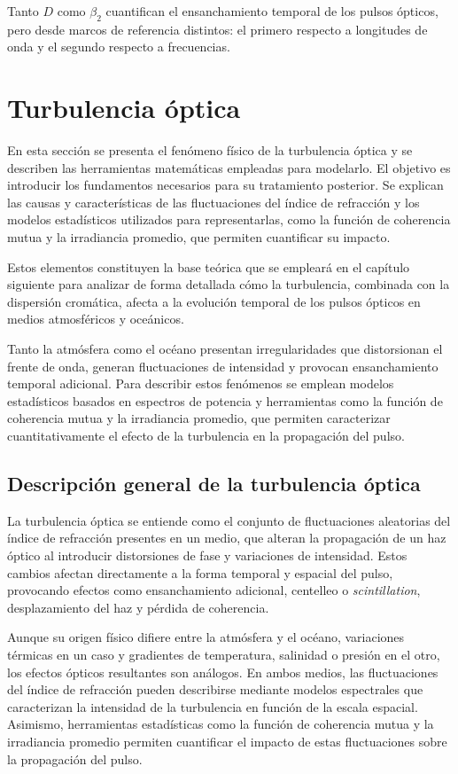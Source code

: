 Tanto $D$ como $\beta_{2}$ cuantifican el ensanchamiento temporal de los pulsos ópticos, pero desde marcos de referencia distintos: el primero respecto a longitudes de onda y el segundo respecto a frecuencias.

\section{Turbulencia óptica}

En esta sección se presenta el fenómeno físico de la turbulencia óptica y se describen las herramientas matemáticas empleadas para modelarlo. El objetivo es introducir los fundamentos necesarios para su tratamiento posterior. Se explican las causas y características de las fluctuaciones del índice de refracción y los modelos estadísticos utilizados para representarlas, como la función de coherencia mutua y la irradiancia promedio, que permiten cuantificar su impacto. 

Estos elementos constituyen la base teórica que se empleará en el capítulo siguiente para analizar de forma detallada cómo la turbulencia, combinada con la dispersión cromática, afecta a la evolución temporal de los pulsos ópticos en medios atmosféricos y oceánicos.

Tanto la atmósfera como el océano presentan irregularidades que distorsionan el frente de onda, generan fluctuaciones de intensidad y provocan ensanchamiento temporal adicional. Para describir estos fenómenos se emplean modelos estadísticos basados en espectros de potencia y herramientas como la función de coherencia mutua y la irradiancia promedio, que permiten caracterizar cuantitativamente el efecto de la turbulencia en la propagación del pulso.

\subsection{Descripción general de la turbulencia óptica}
La turbulencia óptica se entiende como el conjunto de fluctuaciones aleatorias del índice de refracción presentes en un medio, que alteran la propagación de un haz óptico al introducir distorsiones de fase y variaciones de intensidad. Estos cambios afectan directamente a la forma temporal y espacial del pulso, provocando efectos como ensanchamiento adicional, centelleo o \textit{scintillation}, desplazamiento del haz y pérdida de coherencia.

Aunque su origen físico difiere entre la atmósfera y el océano, variaciones térmicas en un caso y gradientes de temperatura, salinidad o presión en el otro, los efectos ópticos resultantes son análogos. En ambos medios, las fluctuaciones del índice de refracción pueden describirse mediante modelos espectrales que caracterizan la intensidad de la turbulencia en función de la escala espacial. Asimismo, herramientas estadísticas como la función de coherencia mutua y la irradiancia promedio permiten cuantificar el impacto de estas fluctuaciones sobre la propagación del pulso.

